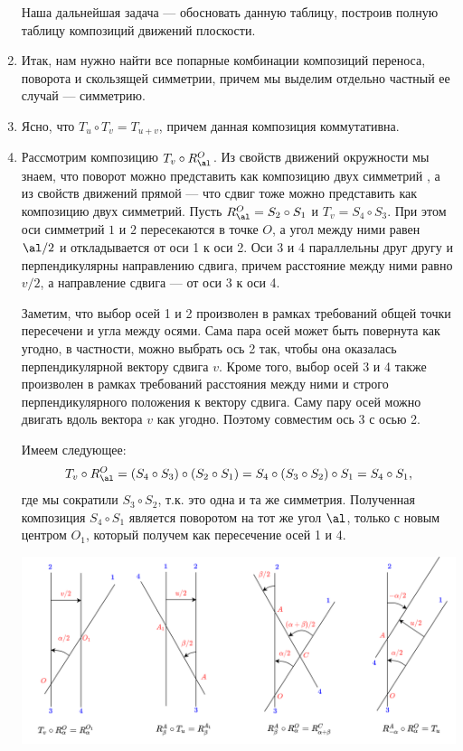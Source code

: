 \begin{enumerate}
Наша дальнейшая задача --- обосновать данную таблицу, построив полную таблицу композиций движений плоскости.

\item Итак, нам нужно найти все попарные комбинации композиций переноса, поворота и скользящей симметрии, причем мы выделим отдельно частный ее случай --- симметрию.

\item Ясно, что $T_u\circ T_v=T_{u+v}$, причем данная композиция коммутативна.

\item Рассмотрим композицию $T_v\circ R_\al^O$. Из свойств движений окружности мы знаем, что поворот можно представить как композицию двух симметрий , а из свойств движений прямой --- что сдвиг тоже можно представить как композицию двух симметрий. Пусть $R_\al^O=S_2\circ S_1$ и $T_v=S_4\circ S_3$. При этом оси симметрий $1$ и $2$ пересекаются в точке $O$, а угол между ними равен $\al/2$ и откладывается от оси 1 к оси 2. Оси 3 и 4 параллельны друг другу и перпендикулярны направлению сдвига, причем расстояние между ними равно $v/2$, а направление сдвига --- от оси 3 к оси 4.

Заметим, что выбор осей 1 и 2 произволен в рамках требований общей точки пересечени и угла между осями. Сама пара осей может быть повернута как угодно, в частности, можно выбрать ось 2 так, чтобы она оказалась перпендикулярной вектору сдвига $v$. Кроме того, выбор осей 3 и 4 также произволен в рамках требований расстояния между ними и строго перпендикулярного положения к вектору сдвига. Саму пару осей можно двигать вдоль вектора $v$ как угодно. Поэтому совместим ось 3 с осью 2.

Имеем следующее:
$$
T_v\circ R_\al^O = (S_4\circ S_3)\circ (S_2\circ S_1) = S_4\circ (S_3\circ S_2)\circ S_1 = S_4\circ S_1,
$$
где мы сократили $S_3\circ S_2$, т.к. это одна и та же симметрия. Полученная композиция $S_4\circ S_1$ является поворотом на тот же угол $\al$, только с новым центром $O_1$, который получем как пересечение осей 1 и 4.
\begin{center}
\includegraphics[scale=0.2]{plane_transit.png}
\end{center}


\end{enumerate}
